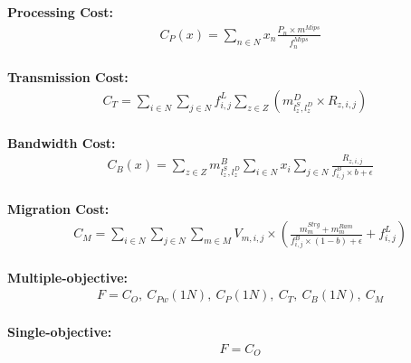 \documentclass{article}
\begin{document}
\noindent\textbf{Processing Cost:}\\[6pt]
\begin{equation*}
\begin{aligned}
& C_P(x) = \sum_{n\in N} x_n \frac{P_n \times m^{Mips}}{f_n^{Mips}}
\end{aligned}
\end{equation*}\\[6pt]

\noindent\textbf{Transmission Cost:}\\[6pt]
\begin{equation*}
\begin{split}
C_T = \sum_{i\in N}\sum_{j\in N} f^L_{i,j}\sum_{z\in Z}\left( m^D_{l^S_z,l^D_z} \times R_{z, i,j} \right)
\end{split}
\end{equation*}\\[6pt]

\noindent\textbf{Bandwidth Cost:}\\[6pt]
\begin{equation*}
\begin{split}
& C_B(x) = \sum_{z\in Z} m^B_{l^S_z,l^D_z} \sum_{i\in N} x_i \sum_{j\in N} \frac{R_{z, i,j}}{f^B_{i,j} \times b + \epsilon}
\end{split}
\end{equation*}\\[6pt]

\noindent\textbf{Migration Cost:}\\[6pt]
\begin{equation*}
\begin{split}
& C_M = \sum_{i\in N}\sum_{j\in N} \sum_{m\in M} V_{m, i,j} \times \left(\frac{m^{Strg}_{m} + m^{Ram}_{m}}{f^B_{i,j}\times (1-b) + \epsilon} + f^L_{i,j} \right)
\end{split}
\end{equation*}\\[6pt]

\pagebreak
\noindent\textbf{Multiple-objective:}\\[6pt]
\begin{equation*}
\begin{split}
& F = C_O,~ C_{Pw}(1N),~ C_P(1N),~ C_T,~ C_B(1N),~ C_M
\end{split}
\end{equation*}\\[6pt]

\noindent\textbf{Single-objective:}\\[6pt]
\begin{equation*}
\begin{split}
& F = C_O
\end{split}
\end{equation*}\\[6pt]
\end{document}

